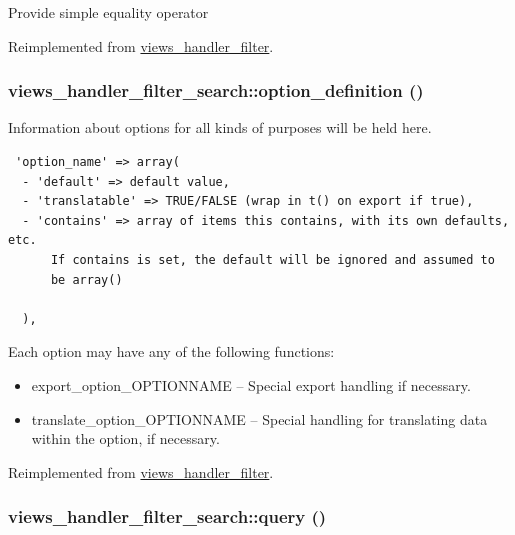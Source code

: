 Provide simple equality operator 

Reimplemented from \hyperlink{classviews__handler__filter_8c77c0a8bba8c3ceceae8950fc7b1121}{views\_\-handler\_\-filter}.\hypertarget{classviews__handler__filter__search_f41b61b9dc7a676fbe0110c1d7ffcfdb}{
\subsubsection[{option\_\-definition}]{\setlength{\rightskip}{0pt plus 5cm}views\_\-handler\_\-filter\_\-search::option\_\-definition ()}}
\label{classviews__handler__filter__search_f41b61b9dc7a676fbe0110c1d7ffcfdb}


Information about options for all kinds of purposes will be held here. 

\begin{Code}\begin{verbatim} 'option_name' => array(
  - 'default' => default value,
  - 'translatable' => TRUE/FALSE (wrap in t() on export if true),
  - 'contains' => array of items this contains, with its own defaults, etc.
      If contains is set, the default will be ignored and assumed to
      be array()

  ),
\end{verbatim}
\end{Code}

 Each option may have any of the following functions:\begin{itemize}
\item export\_\-option\_\-OPTIONNAME -- Special export handling if necessary.\item translate\_\-option\_\-OPTIONNAME -- Special handling for translating data within the option, if necessary. \end{itemize}


Reimplemented from \hyperlink{classviews__handler__filter_053c9173084f1409a92eb390854ec304}{views\_\-handler\_\-filter}.\hypertarget{classviews__handler__filter__search_f972f15bdc716b36d04d9a9d4f20b6f5}{
\subsubsection[{query}]{\setlength{\rightskip}{0pt plus 5cm}views\_\-handler\_\-filter\_\-search::query ()}}
\label{classviews__handler__filter__search_f972f15bdc716b36d04d9a9d4f20b6f5}



